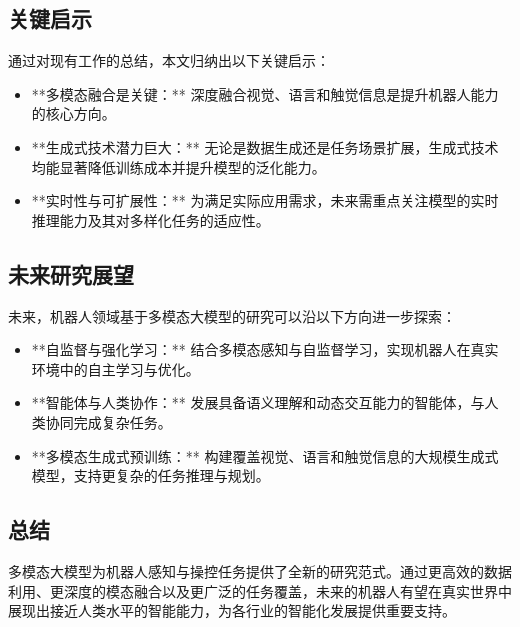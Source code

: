 \documentclass[a4paper]{article}
\begin{document}
\subsection{关键启示}
通过对现有工作的总结，本文归纳出以下关键启示：
\begin{itemize}
    \item **多模态融合是关键：** 深度融合视觉、语言和触觉信息是提升机器人能力的核心方向。
    \item **生成式技术潜力巨大：** 无论是数据生成还是任务场景扩展，生成式技术均能显著降低训练成本并提升模型的泛化能力。
    \item **实时性与可扩展性：** 为满足实际应用需求，未来需重点关注模型的实时推理能力及其对多样化任务的适应性。
\end{itemize}

\subsection{未来研究展望}
未来，机器人领域基于多模态大模型的研究可以沿以下方向进一步探索：
\begin{itemize}
    \item **自监督与强化学习：** 结合多模态感知与自监督学习，实现机器人在真实环境中的自主学习与优化\cite{wang2023robogen, hu2023look}。
    \item **智能体与人类协作：** 发展具备语义理解和动态交互能力的智能体，与人类协同完成复杂任务。
    \item **多模态生成式预训练：** 构建覆盖视觉、语言和触觉信息的大规模生成式模型，支持更复杂的任务推理与规划\cite{mandlekar2023mimicgen, huang2023embodied}。
\end{itemize}

\subsection{总结}
多模态大模型为机器人感知与操控任务提供了全新的研究范式。通过更高效的数据利用、更深度的模态融合以及更广泛的任务覆盖，未来的机器人有望在真实世界中展现出接近人类水平的智能能力，为各行业的智能化发展提供重要支持\cite{driess2023palm, wang2023robogen, chi2024universal}。
\end{document}
